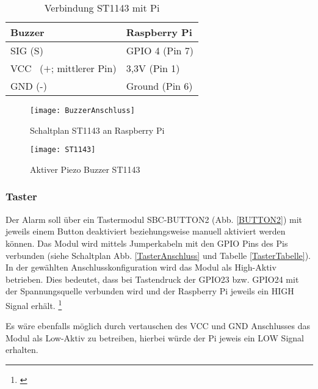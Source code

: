 	\begin{table}[H]
		\centering
		\begin{tabular}{|p{5cm}|p{5cm}|} 
			\hline
			Buzzer & Raspberry Pi\\ 
			\hline
			SIG (S)   & GPIO 4 \hspace{0,1cm}(Pin 7)\\  
			\hline
			VCC~ ($+$; mittlerer Pin)   & 3,3V 	\hspace{0,7cm}(Pin 1)\\
			\hline
			GND (-)    & Ground  	\hspace{0,2cm}(Pin 6)\\
			\hline
		\end{tabular}
	\caption{Verbindung ST1143 mit Pi}
	\label{BuzzerTabelle}
	\end{table} 

	\begin{figure}[H]
	\centering
	\texttt{[image: BuzzerAnschluss]}
	\caption{Schaltplan ST1143 an Raspberry Pi}
	\label{BuzzerAnschluss}
	\end{figure}

	\begin{figure}[H]	%
	\centering
	\texttt{[image: ST1143]}
	\caption{Aktiver Piezo Buzzer ST1143 \cite{reicheltelektronikGmbH&amp.21.04.2022}}
	\label{ST1143}
	\end{figure}

\subsubsection{Taster}

Der Alarm soll über ein Tastermodul SBC-BUTTON2 (Abb. \ref{BUTTON2}) mit jeweils einem Button deaktiviert beziehungsweise manuell aktiviert werden können.
Das Modul wird mittels Jumperkabeln mit den GPIO Pins des Pis verbunden (siehe Schaltplan Abb. \ref{TasterAnschluss} und Tabelle \ref{TasterTabelle}). 
In der gewählten Anschlusskonfiguration wird das Modul als High-Aktiv betrieben. Dies bedeutet, dass bei Tastendruck der GPIO23 bzw. GPIO24 mit der Spannungsquelle verbunden wird und der Raspberry Pi jeweils ein HIGH Signal erhält. \footnote{\cite{.19.04.2022}}\par 
Es wäre ebenfalls möglich durch vertauschen des VCC und GND Anschlusses das Modul als Low-Aktiv zu betreiben, hierbei würde der Pi jeweis ein LOW Signal erhalten.

